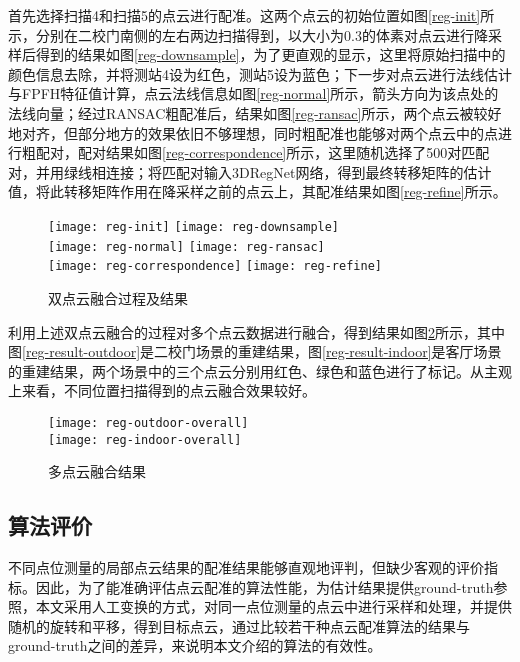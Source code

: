 首先选择扫描4和扫描5的点云进行配准。这两个点云的初始位置如图\ref{reg-init}所示，分别在二校门南侧的左右两边扫描得到，以大小为0.3的体素对点云进行降采样后得到的结果如图\ref{reg-downsample}，为了更直观的显示，这里将原始扫描中的颜色信息去除，并将测站4设为红色，测站5设为蓝色；下一步对点云进行法线估计与FPFH特征值计算，点云法线信息如图\ref{reg-normal}所示，箭头方向为该点处的法线向量；经过RANSAC粗配准后，结果如图\ref{reg-ransac}所示，两个点云被较好地对齐，但部分地方的效果依旧不够理想，同时粗配准也能够对两个点云中的点进行粗配对，配对结果如图\ref{reg-correspondence}所示，这里随机选择了500对匹配对，并用绿线相连接；将匹配对输入3DRegNet网络，得到最终转移矩阵的估计值，将此转移矩阵作用在降采样之前的点云上，其配准结果如图\ref{reg-refine}所示。
\begin{figure}
	\centering
	{\texttt{[image: reg-init]}}
	{\texttt{[image: reg-downsample]}}\\
	{\texttt{[image: reg-normal]}}
	{\texttt{[image: reg-ransac]}}\\
	{\texttt{[image: reg-correspondence]}}
	{\texttt{[image: reg-refine]}}
	\caption{双点云融合过程及结果}
	\label{reg-outdoor-process}
\end{figure}

利用上述双点云融合的过程对多个点云数据进行融合，得到结果如图\ref{reg-result}所示，其中图\ref{reg-result-outdoor}是二校门场景的重建结果，图\ref{reg-result-indoor}是客厅场景的重建结果，两个场景中的三个点云分别用红色、绿色和蓝色进行了标记。从主观上来看，不同位置扫描得到的点云融合效果较好。
\begin{figure}
	\centering
	{\texttt{[image: reg-outdoor-overall]}}\\
	{\texttt{[image: reg-indoor-overall]}}
	\caption{多点云融合结果}
	\label{reg-result}
\end{figure}

\subsection{算法评价}
不同点位测量的局部点云结果的配准结果能够直观地评判，但缺少客观的评价指标。因此，为了能准确评估点云配准的算法性能，为估计结果提供ground-truth参照，本文采用人工变换的方式，对同一点位测量的点云中进行采样和处理，并提供随机的旋转和平移，得到目标点云，通过比较若干种点云配准算法的结果与ground-truth之间的差异，来说明本文介绍的算法的有效性。

